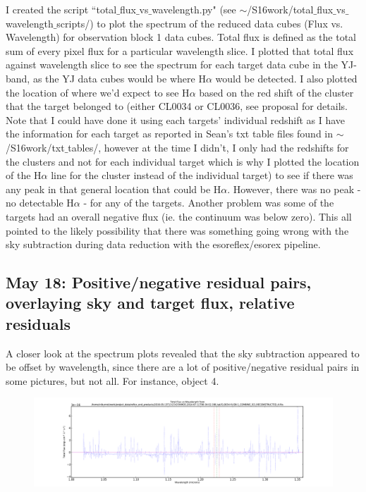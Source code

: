 \documentclass[10pt,letterpaper]{article}
\begin{document}
I created the script ``total$\_$flux$\_$vs$\_$wavelength.py" (see $\sim$/S16work/total$\_$flux$\_$vs$\_$wavelength$\_$scripts/) to plot the spectrum of the reduced data cubes (Flux vs. Wavelength) for observation block 1 data cubes. Total flux is defined as the total sum of every pixel flux for a particular wavelength slice. I plotted that total flux against wavelength slice to see the spectrum for each target data cube in the YJ-band, as the YJ data cubes would be where H$\alpha$ would be detected. I also plotted the location of where we'd expect to see H$\alpha$ based on the red shift of the cluster that the target belonged to (either CL0034 or CL0036, see proposal for details. Note that I could have done it using each targets' individual redshift as I have the information for each target as reported in Sean's txt table files found in $\sim$/S16work/txt$\_$tables/, however at the time I didn't, I only had the redshifts for the clusters and not for each individual target which is why I plotted the location of the H$\alpha$ line for the cluster instead of the individual target) to see if there was any peak in that general location that could be H$\alpha$. However, there was no peak - no detectable H$\alpha$ - for any of the targets. Another problem was some of the targets had an overall negative flux (ie. the continuum was below zero). This all pointed to the likely possibility that there was something going wrong with the sky subtraction during data reduction with the esoreflex/esorex pipeline.

\subsection{May 18: Positive/negative residual pairs, overlaying sky and target flux, relative residuals}
A closer look at the spectrum plots revealed that the sky subtraction appeared to be offset by wavelength, since there are a lot of positive/negative residual pairs in some pictures, but not all. For instance, object 4.\\

\begin{figure}[h!]
\includegraphics[scale=0.4]{figures/CL0034-YJ-OB-1_COMBINE_SCI_RECONSTRUCTED_4.pdf}
\end{figure}
\end{document}
